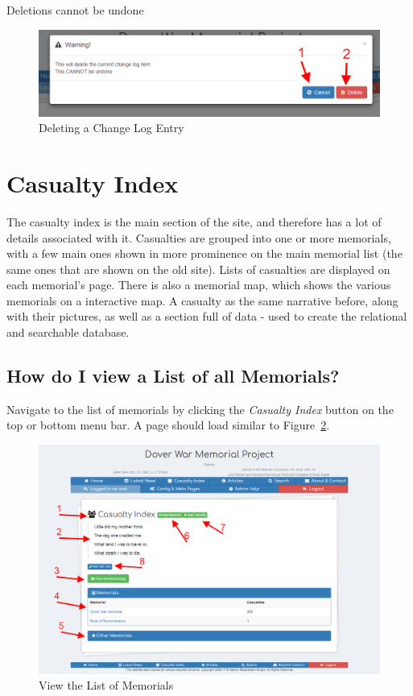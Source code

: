 \documentclass[12pt]{article}
\begin{document}
\begin{warningBox}
Deletions cannot be undone
\end{warningBox}

\begin{figure}[h]
  \centering
 \includegraphics[width=.9\textwidth]{pics/delete_change.png}
	\caption{Deleting a Change Log Entry}\label{fig:delete_change}
\end{figure}

\newpage
\FloatBarrier
\section{Casualty Index}\label{sec:casualtyIndex}

The casualty index is the main section of the site, and therefore has a lot of details associated with it. Casualties are grouped into one or more memorials, with a few main ones shown in more prominence on the main memorial list (the same ones that are shown on the old site). Lists of casualties are displayed on each memorial's page. There is also a memorial map, which shows the various memorials on a interactive map. A casualty as the same narrative before, along with their pictures, as well as a section full of data - used to create the relational and searchable database.

\subsection{How do I view a List of all Memorials?}\label{ssec:view_memorials}
Navigate to the list of memorials by clicking the \textit{Casualty Index} button on the top or bottom menu bar. A page should load similar to Figure~\ref{fig:view_memorials}.

\begin{figure}[h]
  \centering
 \includegraphics[width=.9\textwidth]{pics/view_memorials.png}
	\caption{View the List of Memorials}\label{fig:view_memorials}
\end{figure}
\end{document}
